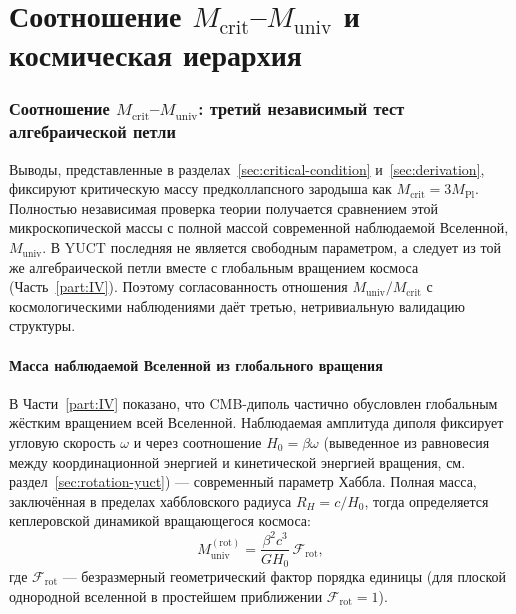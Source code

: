 \documentclass[11pt,a4paper]{article}
\begin{document}
	\clearpage
	\part{Соотношение \(M_{\mathrm{crit}}\)–\(M_{\mathrm{univ}}\) и космическая иерархия}
	\label{part:II}
	
	\section{Соотношение \(M_{\mathrm{crit}}\)–\(M_{\mathrm{univ}}\): третий независимый тест алгебраической петли}
	\label{sec:third-test}
	
	Выводы, представленные в разделах~\ref{sec:critical-condition} и~\ref{sec:derivation}, фиксируют критическую массу предколлапсного зародыша как \(M_{\mathrm{crit}} = 3 M_{\mathrm{Pl}}\). Полностью независимая проверка теории получается сравнением этой микроскопической массы с полной массой современной наблюдаемой Вселенной, \(M_{\mathrm{univ}}\). В YUCT последняя не является свободным параметром, а следует из той же алгебраической петли вместе с глобальным вращением космоса (Часть~\ref{part:IV}). Поэтому согласованность отношения \(M_{\mathrm{univ}} / M_{\mathrm{crit}}\) с космологическими наблюдениями даёт третью, нетривиальную валидацию структуры.
	
	\subsection{Масса наблюдаемой Вселенной из глобального вращения}
	
	В Части~\ref{part:IV} показано, что CMB-диполь частично обусловлен глобальным жёстким вращением всей Вселенной. Наблюдаемая амплитуда диполя фиксирует угловую скорость \(\omega\) и через соотношение \(H_0 = \beta \omega\) (выведенное из равновесия между координационной энергией и кинетической энергией вращения, см. раздел~\ref{sec:rotation-yuct}) — современный параметр Хаббла. Полная масса, заключённая в пределах хаббловского радиуса \(R_H = c / H_0\), тогда определяется кеплеровской динамикой вращающегося космоса:
	\begin{equation}
		M_{\mathrm{univ}}^{\mathrm{(rot)}} = \frac{\beta^2 c^3}{G H_0} \, \mathcal{F}_{\mathrm{rot}},
		\label{eq:muniv-rot}
	\end{equation}
	где \(\mathcal{F}_{\mathrm{rot}}\) — безразмерный геометрический фактор порядка единицы (для плоской однородной вселенной в простейшем приближении \(\mathcal{F}_{\mathrm{rot}} = 1\)).
	
\end{document}
